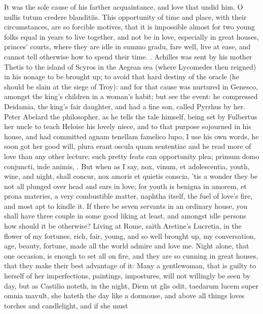 It was the sole cause of his farther acquaintance, and love that undid
him. O nullis tutum credere blanditiis.
This opportunity of time and place, with their circumstances, are so
forcible motives, that it is impossible almost for two young folks
equal in years to live together, and not be in love, especially in
great houses, princes' courts, where they are idle in summo gradu, fare
well, live at ease, and cannot tell otherwise how to spend their time.
. Achilles was sent by his
mother Thetis to the island of Scyros in the Aegean sea (where
Lycomedes then reigned) in his nonage to be brought up; to avoid that
hard destiny of the oracle (he should be slain at the siege of Troy):
and for that cause was nurtured in Genesco, amongst the king's children
in a woman's habit; but see the event: he compressed Deidamia, the
king's fair daughter, and had a fine son, called Pyrrhus by her. Peter
Abelard the philosopher, as he tells the tale himself, being set by
Fulbertus her uncle to teach Heloise his lovely niece, and to that
purpose sojourned in his house, and had committed agnam tenellam
famelico lupo, I use his own words, he soon got her good will, plura
erant oscula quam sententiae and he read more of love than any other
lecture; such pretty feats can opportunity plea; primum domo conjuncti,
inde animis, \etc{}. But when as I say, nox, vinum, et adolescentia, youth,
wine, and night, shall concur, nox amoris et quietis conscia, 'tis a
wonder they be not all plunged over head and ears in love; for youth is
benigna in amorem, et prona materies, a very combustible matter,
naphtha itself, the fuel of love's fire, and most apt to kindle it. If
there be seven servants in an ordinary house, you shall have three
couple in some good liking at least, and amongst idle persons how
should it be otherwise? Living at Rome, saith Aretine's Lucretia,
in the flower of my fortunes, rich, fair, young, and so well brought
up, my conversation, age, beauty, fortune, made all the world admire
and love me. Night alone, that one occasion, is enough to set all on
fire, and they are so cunning in great houses, that they make their
best advantage of it: Many a gentlewoman, that is guilty to herself of
her imperfections, paintings, impostures, will not willingly be seen by
day, but as Castilio noteth, in the night, Diem ut glis odit,
taedarum lucem super omnia mavult, she hateth the day like a dormouse,
and above all things loves torches and candlelight, and if she must
